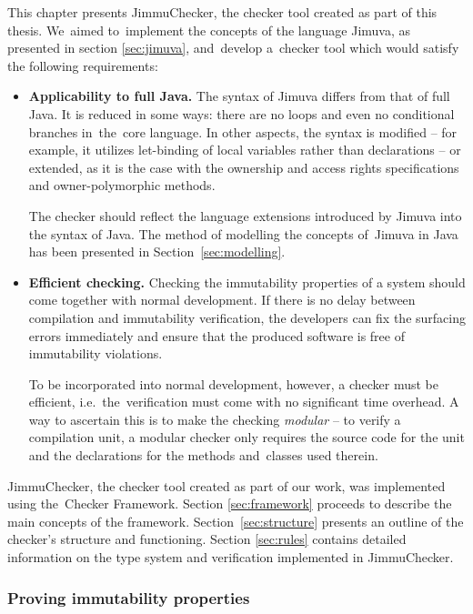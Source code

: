 \documentclass{pracamgr}
\theoremstyle{break}
\theoremstyle{break}
\theoremstyle{break}
\begin{document}
This chapter presents JimmuChecker, the checker tool created as
part of this thesis. We~aimed to~implement the concepts of the
language Jimuva, as presented in section \ref{sec:jimuva}, and~develop
a~checker tool which would satisfy the following requirements:
\begin{itemize}
\item \textbf{Applicability to full Java.} The syntax of Jimuva
  differs from that of full Java. It is reduced in some ways: there
  are no loops and even no conditional branches in~the~core
  language. In other aspects, the syntax is modified -- for example,
  it utilizes let-binding of local variables rather than declarations
  -- or extended, as it is the case with the ownership and access
  rights specifications and owner-polymorphic methods.

  The checker should reflect the language extensions introduced by
  Jimuva into the syntax of Java. The method of modelling the concepts
  of~Jimuva in Java has been presented in Section~\ref{sec:modelling}.
\item \textbf{Efficient checking.} Checking the immutability
  properties of a system should come together with normal
  development. If there is no delay between compilation and
  immutability verification, the developers can fix the surfacing
  errors immediately and ensure that the produced software is free of
  immutability violations.

  To be incorporated into normal development, however, a checker must
  be efficient, i.e.~the~verification must come with no significant
  time overhead. A way to ascertain this is to make the checking
  \emph{modular} -- to verify a compilation unit, a modular checker
  only requires the source code for the unit and the declarations for
  the methods and~classes used therein.
\end{itemize}

JimmuChecker, the checker tool created as part of our work, was
implemented using the~Checker Framework. Section \ref{sec:framework}
proceeds to describe the main concepts of the
framework. Section~\ref{sec:structure} presents an outline of the
checker's structure and functioning.  Section \ref{sec:rules} contains
detailed information on the type system and verification implemented
in JimmuChecker.

\subsubsection{Proving immutability properties}
\end{document}
